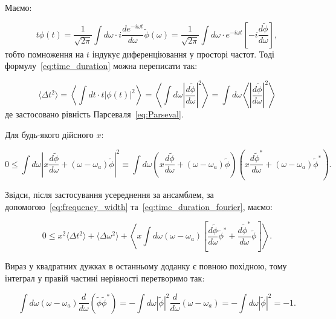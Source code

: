 Маємо:

\begin{equation*}
    t \phi(t) = \frac{1}{\sqrt{2\pi}} \int d\omega \cdot i \frac{d e^{-i\omega t}}{d\omega} \tilde\phi(\omega) = \frac{1}{\sqrt{2\pi}} \int d\omega \cdot
    e^{-i\omega t} \left[ -i \frac{d\tilde\phi}{d\omega} \right],
\end{equation*}
тобто помноження на \( t \) індукує диференціювання у просторі частот. Тоді формулу~\eqref{eq:time_duration} можна переписати так:

\begin{equation}
    \langle \Delta t^2 \rangle =
    \left\langle \int dt \cdot t |\phi(t)|^2 \right\rangle =
    \left\langle
    \int d\omega
    \left|
    \frac{d\tilde\phi}{d\omega}
    \right|^2
    \right\rangle
    =
    \int d\omega
    \left\langle
    \left| \frac{d\tilde{\phi}}{d\omega} \right|^2
    \right\rangle
    \label{eq:time_duration_fourier}
\end{equation}
%
де застосовано рівність Парсеваля~\eqref{eq:Parseval}.

Для будь-якого дійсного \( x \):

\begin{equation*}
    0 \leqslant \int d\omega \left| x \frac{d\tilde\phi}{d\omega} + (\omega - \omega_a) \tilde\phi \right|^2
    \equiv
    \int d\omega \left( x \frac{d\tilde\phi}{d\omega} + (\omega -
    \omega_a) \tilde\phi \right) \left( x \frac{d\tilde\phi^{*}}{d\omega} + (\omega - \omega_a) \tilde\phi^{*} \right).
\end{equation*}

Звідси, після застосування усереднення за ансамблем, за допомогою~\eqref{eq:frequency_width} та~\eqref{eq:time_duration_fourier}, маємо:

\begin{equation*}
    0 \leqslant  x^2 \langle \Delta t^2 \rangle
    +
    \langle \Delta \omega^2 \rangle
    +
    \left\langle x \int d\omega (\omega - \omega_a) \left[ \frac{d\tilde\phi}{d\omega}
        \tilde\phi^{*} + \frac{d\tilde\phi^{*}}{d\omega} \tilde\phi \right] \right\rangle.
\end{equation*}

Вираз у квадратних дужках в останньому доданку є повною похідною, тому інтеграл у правій частині нерівності перетворимо так:

\begin{equation*}
    \int d\omega (\omega - \omega_a) \frac{d}{d\omega} (\tilde\phi \tilde\phi^{*}) = -\int d\omega |\tilde\phi|^2 \frac{d}{d\omega} (\omega - \omega_a) = - \int d\omega \left| \tilde\phi\right|^2 =  -1.
\end{equation*}

